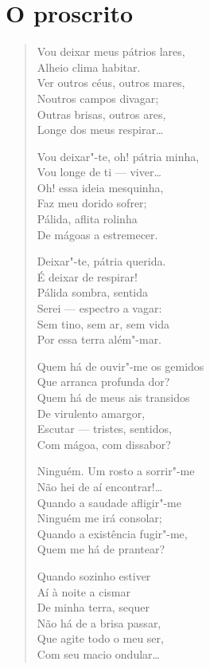 \chapter{O proscrito}

\begin{verse}
Vou deixar meus pátrios lares,\\
Alheio clima habitar.\\
Ver outros céus, outros mares,\\
Noutros campos divagar;\\
Outras brisas, outros ares,\\
Longe dos meus respirar\ldots{}

Vou deixar"-te, oh! pátria minha,\\
Vou longe de ti --- viver\ldots{}\\
Oh! essa ideia mesquinha,\\
Faz meu dorido sofrer;\\
Pálida, aflita rolinha\\
De mágoas a estremecer.

Deixar"-te, pátria querida.\\
É deixar de respirar!\\
Pálida sombra, sentida\\
Serei --- espectro a vagar:\\
Sem tino, sem ar, sem vida\\
Por essa terra além"-mar.

Quem há de ouvir"-me os gemidos\\
Que arranca profunda dor?\\
Quem há de meus ais transidos\\
De virulento amargor,\\
Escutar --- tristes, sentidos,\\
Com mágoa, com dissabor?

Ninguém. Um rosto a sorrir"-me\\
Não hei de aí encontrar!\ldots{}\\
Quando a saudade afligir"-me\\
Ninguém me irá consolar;\\
Quando a existência fugir"-me,\\
Quem me há de prantear?

Quando sozinho estiver\\
Aí à noite a cismar\\
De minha terra, sequer\\
Não há de a brisa passar,\\
Que agite todo o meu ser,\\
Com seu macio ondular\ldots{}
\end{verse}

